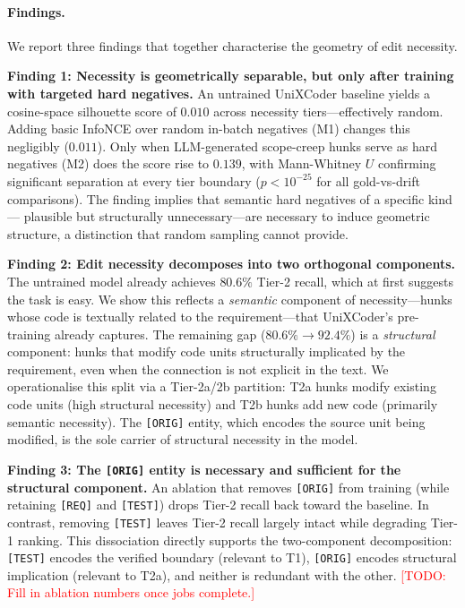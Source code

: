 \documentclass{article}
\newcommand{\REQ}{\texttt{[REQ]}}
\newcommand{\TEST}{\texttt{[TEST]}}
\newcommand{\ORIG}{\texttt{[ORIG]}}
\newcommand{\todo}[1]{\textcolor{red}{[TODO: #1]}}
\begin{document}
\paragraph{Findings.}
We report three findings that together characterise the geometry of edit
necessity.

\textbf{Finding 1: Necessity is geometrically separable, but only after
training with targeted hard negatives.}
An untrained UniXCoder baseline yields a cosine-space silhouette score of
$0.010$ across necessity tiers---effectively random.
Adding basic InfoNCE over random in-batch negatives (M1) changes this
negligibly ($0.011$).
Only when LLM-generated scope-creep hunks serve as hard negatives (M2) does
the score rise to $0.139$, with Mann-Whitney $U$ confirming significant
separation at every tier boundary ($p < 10^{-25}$ for all gold-vs-drift
comparisons).
The finding implies that semantic hard negatives of a specific kind---
plausible but structurally unnecessary---are necessary to induce geometric
structure, a distinction that random sampling cannot provide.

\textbf{Finding 2: Edit necessity decomposes into two orthogonal components.}
The untrained model already achieves $80.6\%$ Tier-2 recall, which at first
suggests the task is easy.
We show this reflects a \emph{semantic} component of necessity---hunks whose
code is textually related to the requirement---that UniXCoder's pre-training
already captures.
The remaining gap ($80.6\% \to 92.4\%$) is a \emph{structural} component:
hunks that modify code units structurally implicated by the requirement, even
when the connection is not explicit in the text.
We operationalise this split via a Tier-2a/2b partition: T2a hunks modify
existing code units (high structural necessity) and T2b hunks add new code
(primarily semantic necessity).
The \ORIG{} entity, which encodes the source unit being modified, is the sole
carrier of structural necessity in the model.

\textbf{Finding 3: The \ORIG{} entity is necessary and sufficient for the
structural component.}
An ablation that removes \ORIG{} from training (while retaining \REQ{} and
\TEST) drops Tier-2 recall back toward the baseline.
In contrast, removing \TEST{} leaves Tier-2 recall largely intact while
degrading Tier-1 ranking.
This dissociation directly supports the two-component decomposition: \TEST{}
encodes the verified boundary (relevant to T1), \ORIG{} encodes structural
implication (relevant to T2a), and neither is redundant with the other.
\todo{Fill in ablation numbers once jobs complete.}
\end{document}
